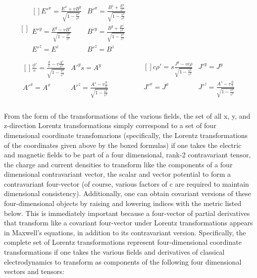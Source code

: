 \documentclass[a4]{article}
\begin{document}
\begin{framed}
\begin{equation}
\begin{aligned}[]
                \begin{aligned}[]
                    E'^{x} = \frac{E^{x} + v B^{y}}{\sqrt{1 - \frac{v^2}{c^2}}} & B'^{x} = \frac{B^{z} + \frac{E^y}{c^2}}{\sqrt{1 - \frac{v^2}{c^2}}} \\
                    E'^{y} = \frac{E^{y} - v B^{x}}{\sqrt{1 - \frac{v^2}{c^2}}} & B'^{y} = \frac{B^{y} + \frac{E^z}{c^2}}{\sqrt{1 - \frac{v^2}{c^2}}} \\
                    E'^{z} = E^{z} & B'^{z} = B^{z} \\
                \end{aligned} \\
                \begin{aligned}[]
                    \frac{\phi'}{c} = \frac{\frac{\phi}{c} - v \frac{A^x}{c^2}}{\sqrt{1 - \frac{v^2}{c^2}}} & A'^{y} s= A^{y} \\
                    A'^{x} = A^{x} & A'^{z} = \frac{A^z - v \frac{\phi}{c}}{\sqrt{1 - \frac{v^2}{c^2}}}
                \end{aligned} \quad & \quad
                \begin{aligned}[]
                    c\rho' = s\frac{J^y - v c \rho}{\sqrt{1 - \frac{v^2}{c^2}}} & J'^{y} = J^{y} \\
                    J'^{x} = J^{x} & J'^{z} = \frac{A^z - v \frac{\phi}{c}}{\sqrt{1 - \frac{v^2}{c^2}}}
                \end{aligned} \\
            \end{aligned}
        \end{equation}
    \end{framed}

    From the form of the transformations of the various fields, the set of all x, y, and z-direction Lorentz transformations simply correspond to a set of four dimensional coordinate transfomarions (specifically, the Lorentz transformations of the coordinates given above
    by the boxed formulas) if one takes the electric and magnetic fields to be part of a four dimensional, rank-2 contravariant tensor, the charge and current densities to transform like the components of a four dimensional contravariant vector, the scalar and vector
    potential to form a contravariant four-vector (of course, various factors of c are required to maintain dimensional consistency). Additionally, one can obtain covariant versions of these four-dimensional objects by raising and lowering indices with the metric listed below.
    This is immediately important because a four-vector of partial derivatives that transform like a covariant four-vector under Lorentz transformations appears in Maxwell's equations, in addition to its contravariant version. Specifically, the complete set of Lorentz
    transformations represent four-dimensional coordinate transformations if one takes the various fields and derivatives of classical electrodynamics to transform as components of the following four dimensional vectors and tensors:
\end{document}
